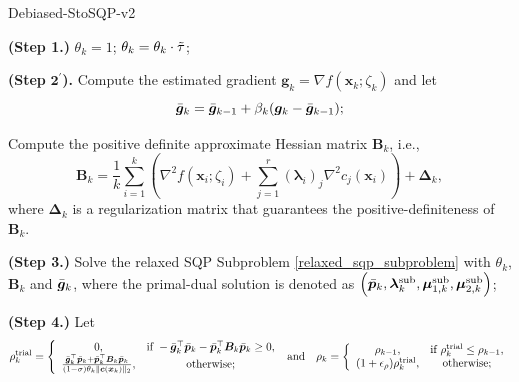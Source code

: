 \documentclass[aos]{imsart}
\numberwithin{equation}{section}
\theoremstyle{plain}
\begin{document}
\begin{algorithm}[htb]
 \caption{Debiased-StoSQP-v2}
 \label{alg_stoch_relaxed_sqp_averaging_grad_Bk}
 \begin{algorithmic}[1]
 \renewcommand{\algorithmicrequire}{\textbf{Input:} $\bm{\ell} \leq \bm{x}_0 \leq \bm{u}$, $\tau, \Tilde{\tau} \in (0,1)$, $\sigma \in (0,1)$, $\rho_{-1} >0$, $\epsilon_{\rho}, \epsilon_{\xi}, \beta \in (0,1)$, $\mu \in (0,1)$, $\varrho>0$, $\{\beta_k\}_{k=0}^{\infty}$, $\{\gamma_k\}_{k=0}^{\infty}$.}
 \REQUIRE 
  \STATE \textbf{(Step 1.)} $\theta_k = 1$;
  \STATE $\theta_k = \theta_k \cdot \Tilde{\tau}$;

  \ENDWHILE

  \STATE \textbf{(Step} $\mathbf{2^{\prime}}$\textbf{).} Compute the estimated gradient $\bm{g}_k = \nabla f(\bm{x}_k; \zeta_{k})$ and let 
  \begin{equation*}
      \Bar{\bm{g}}_k = \Bar{\bm{g}}_{k-1} + \beta_k (\bm{g}_k - \Bar{\bm{g}}_{k-1});
  \end{equation*}

  \STATE Compute the positive definite approximate Hessian matrix $\bm{B}_k$, i.e., \begin{equation*}
        \bm{B}_k = \frac{1}{k} \sum_{i=1}^{k} \left( \nabla^2 f(\bm{x}_i; \zeta_{i}) + \sum_{j=1}^{r} \left( \bm{\lambda}_{i}\right)_{j}\nabla^2 c_j(\bm{x}_{i})\right) + \bm{\Delta}_k,
\end{equation*}
 where $\bm{\Delta}_k$ is a regularization matrix that guarantees the positive-definiteness of $\bm{B}_k$. 
  
  \STATE \textbf{(Step 3.)} Solve the relaxed SQP Subproblem \eqref{relaxed_sqp_subproblem} with $\theta_k$, $\bm{B}_k$ and $\Bar{\bm{g}}_{k}$, where the primal-dual solution is denoted as $\left(\Bar{\bm{p}}_k,  \bm{\lambda}_k^{\text{sub}}, \bm{\mu}_{1,k}^{\text{sub}}, \bm{\mu}_{2,k}^{\text{sub}} \right)$;

  \STATE \textbf{(Step 4.)} Let \begin{equation*}
        \rho_k^{\text{trial}} = \left \{ \begin{array}{cc}
           0,  & \text{if}~ -\Bar{\bm{g}}_k^{\top} \Bar{\bm{p}}_k - \Bar{\bm{p}}_k^{\top} \bm{B}_k \Bar{\bm{p}}_k \geq 0, \\
           \frac{\Bar{\bm{g}}_k^{\top} \Bar{\bm{p}}_k + \Bar{\bm{p}}_k^{\top} \bm{B}_k \Bar{\bm{p}}_k}{(1-\sigma)\theta_k \|\bm{c}(\bm{x}_k)\|_2},  &  \text{otherwise;}
        \end{array}\right.
        ~\text{and} \quad 
         \rho_k = \left\{ \begin{array}{cc}
        \rho_{k-1}, &  \text{if}~\rho_{k}^{\text{trial}} \leq \rho_{k-1}, \\
        (1+\epsilon_{\rho})\rho_{k}^{\text{trial}}, & \text{otherwise};
    \end{array} \right.
         \end{equation*}


\end{algorithmic}
\end{algorithm}
\end{document}
